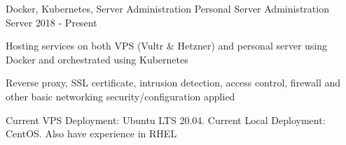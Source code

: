 

\begin{cventries}

  \cventry
    {Docker, Kubernetes, Server Administration}
    {Personal Server Administration}
    {Server}
    {2018 - Present}
    {
      \begin{cvitems}
        \item{Hosting services on both VPS (Vultr \& Hetzner) and personal server using Docker and orchestrated using Kubernetes}
        \item{Reverse proxy, SSL certificate, intrusion detection, access control, firewall and other basic networking security/configuration applied}
        \item{Current VPS Deployment: Ubuntu LTS 20.04. Current Local Deployment: CentOS. Also have experience in RHEL}
      \end{cvitems}
    }




\end{cventries}
